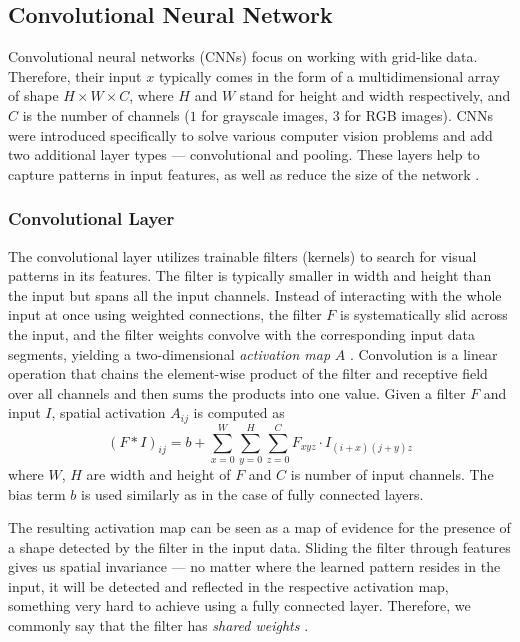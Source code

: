 \subsection*{Convolutional Neural Network}
Convolutional neural networks (CNNs) focus on working with grid-like data.
Therefore, their input $x$ typically comes in the form of a multidimensional array of shape $H \times W \times C$, where $H$ and $W$ stand for height and width respectively, and $C$ is the number of channels ($1$ for grayscale images, $3$ for RGB images).
CNNs were introduced specifically to solve various computer vision problems and add two additional layer types --- convolutional and pooling.
These layers help to capture patterns in input features, as well as reduce the size of the network \cite{cnns}. 


\subsubsection{Convolutional Layer}

The convolutional layer utilizes trainable filters (kernels) to search for visual patterns in its features.
The filter is typically smaller in width and height than the input but spans all the input channels.
Instead of interacting with the whole input at once using weighted connections, the filter $F$ is systematically slid across the input, and the filter weights convolve with the corresponding input data segments, yielding a two-dimensional \emph{activation map} $A$ \cite{goodfellow}.
Convolution is a linear operation that chains the element-wise product of the filter and receptive field over all channels and then sums the products into one value. Given a filter $F$ and input $I$, spatial activation $A_{ij}$ is computed as 
\begin{equation}
    (F * I)_{ij} = b + \sum_{x=0}^{W} \sum_{y=0}^{H} \sum_{z=0}^{C} F_{xyz} \cdot I_{(i+x)(j+y)z}
\end{equation}
where $W$, $H$ are width and height of $F$ and $C$ is number of input channels. The bias term $b$ is used similarly as in the case of fully connected layers.

The resulting activation map can be seen as a map of evidence for the presence of a shape detected by the filter in the input data.
Sliding the filter through features gives us spatial invariance --- no matter where the learned pattern resides in the input, it will be detected and reflected in the respective activation map, something very hard to achieve using a fully connected layer.
Therefore, we commonly say that the filter has \emph{shared weights} \cite{goodfellow}.

